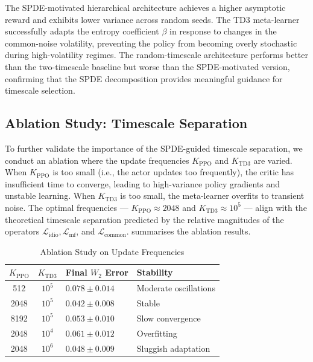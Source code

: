 The SPDE-motivated hierarchical architecture achieves a higher asymptotic reward and
exhibits lower variance across random seeds. The TD3 meta-learner successfully
adapts the entropy coefficient $\beta$ in response to changes in the common-noise
volatility, preventing the policy from becoming overly stochastic during
high-volatility regimes. The random-timescale architecture performs better than the
two-timescale baseline but worse than the SPDE-motivated version, confirming that the
SPDE decomposition provides meaningful guidance for timescale selection.

\subsection{Ablation Study: Timescale Separation}

To further validate the importance of the SPDE-guided timescale separation, we
conduct an ablation where the update frequencies $K_{\mathrm{PPO}}$ and
$K_{\mathrm{TD3}}$ are varied. When $K_{\mathrm{PPO}}$ is too small (i.e., the actor
updates too frequently), the critic has insufficient time to converge, leading to
high-variance policy gradients and unstable learning. When $K_{\mathrm{TD3}}$ is too
small, the meta-learner overfits to transient noise. The optimal frequencies ---
$K_{\mathrm{PPO}} \approx 2048$ and $K_{\mathrm{TD3}} \approx 10^5$ --- align with
the theoretical timescale separation predicted by the relative magnitudes of the
operators $\mathcal{L}_{\mathrm{idio}}, \mathcal{L}_{\mathrm{mf}}$, and
$\mathcal{L}_{\mathrm{common}}$.  summarises the ablation
results.

\begin{table}[ht]
\centering
\caption{Ablation Study on Update Frequencies}
\label{tab:ablation-results}
\begin{tabular}{ccll}
\toprule
$K_{\mathrm{PPO}}$ & $K_{\mathrm{TD3}}$ & \textbf{Final $W_2$ Error} & \textbf{Stability} \\
\midrule
512 & $10^5$ & $0.078 \pm 0.014$ & Moderate oscillations \\
2048 & $10^5$ & $0.042 \pm 0.008$ & Stable \\
8192 & $10^5$ & $0.053 \pm 0.010$ & Slow convergence \\
2048 & $10^4$ & $0.061 \pm 0.012$ & Overfitting \\
2048 & $10^6$ & $0.048 \pm 0.009$ & Sluggish adaptation \\
\bottomrule
\end{tabular}
\end{table}


